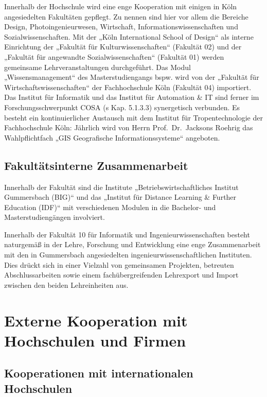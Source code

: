 Innerhalb der Hochschule wird eine enge Kooperation mit einigen in Köln
angesiedelten Fakultäten gepflegt. Zu nennen sind hier vor allem die
Bereiche Design, Photoingenieurwesen, Wirtschaft,
Informationswissenschaften und Sozialwissenschaften. Mit der „Köln
International School of Design`` als interne Einrichtung der „Fakultät
für Kulturwissenschaften`` (Fakultät 02) und der „Fakultät für
angewandte Sozialwissenschaften`` (Fakultät 01) werden gemeinsame
Lehrveranstaltungen durchgeführt. Das Modul „Wissensmanagement`` des
Masterstudiengangs bspw. wird von der „Fakultät für
Wirtschaftswissenschaften`` der Fachhochschule Köln (Fakultät 04)
importiert. Das Institut für Informatik und das Institut für Automation
\& IT sind ferner im Forschungsschwerpunkt COSA (s Kap. 5.1.3.3)
synergetisch verbunden. Es besteht ein kontinuierlicher Austausch mit
dem Institut für Tropentechnologie der Fachhochschule Köln: Jährlich
wird von Herrn Prof.~Dr.~Jacksons Roehrig das Wahlpflichtfach „GIS
Geografische Informationssysteme`` angeboten.

\subsection{Fakultätsinterne
Zusammenarbeit}\label{fakultuxe4tsinterne-zusammenarbeit}

Innerhalb der Fakultät sind die Institute „Betriebswirtschaftliches
Institut Gummersbach (BIG)`` und das „Institut für Distance Learning \&
Further Education (IDF)`` mit verschiedenen Modulen in die Bachelor- und
Masterstudiengängen involviert.

Innerhalb der Fakultät 10 für Informatik und Ingenieurwissenschaften
besteht naturgemäß in der Lehre, Forschung und Entwicklung eine enge
Zusammenarbeit mit den in Gummersbach angesiedelten
ingenieurwissenschaftlichen Instituten. Dies drückt sich in einer
Vielzahl von gemeinsamen Projekten, betreuten Abschlussarbeiten sowie
einem fachübergreifenden Lehrexport und Import zwischen den beiden
Lehreinheiten aus.

\section{Externe Kooperation mit Hochschulen und
Firmen}\label{externe-kooperation-mit-hochschulen-und-firmen}

\subsection{Kooperationen mit internationalen
Hochschulen}\label{kooperationen-mit-internationalen-hochschulen}

